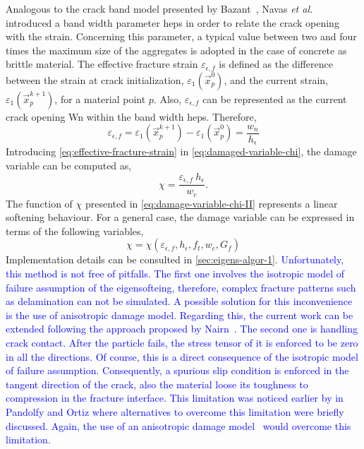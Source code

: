 \documentclass[preprint,12pt,a4paper]{elsarticle}
\begin{document}
Analogous to the crack band model presented by
Bazant~\cite{Bazant83}, Navas {\it et al.} \cite{Navas_2018_ES}
\cite{Navas_2017_ES} introduced a band width parameter \gls{heps} in order to relate the crack opening with the strain.
Concerning this parameter, a typical value between two and
four times the maximum size of the aggregates is adopted in the case of
concrete as brittle material. The effective fracture strain
$\varepsilon_{\epsilon,f}$ is defined as the difference between the strain at crack initialization,
$\varepsilon_1(\vec{x}_p^{0})$, and the current strain, $\varepsilon_1(\vec{x}_p^{k+1})$, for a material point $p$. Also,
$\varepsilon_{\epsilon,f}$ can be represented as the current crack
opening \gls{Wn} within the band width \gls{heps}. Therefore, 
\begin{equation}
  \label{eq:effective-fracture-strain}
  \varepsilon_{\epsilon,f} = \varepsilon_1(\vec{x}_p^{k+1}) -
  \varepsilon_1(\vec{x}_p^{0}) = \frac{w_n}{h_{\epsilon}}
\end{equation}
Introducing \eqref{eq:effective-fracture-strain} in
\eqref{eq:damaged-variable-chi}, the damage variable can be computed
as,
\begin{equation}
  \label{eq:damage-variable-chi-II}
\chi = \frac{\varepsilon_{\epsilon,f}\ h_{\epsilon}}{w_c}.  
\end{equation}
The function of $\chi$ presented in \eqref{eq:damage-variable-chi-II}
represents a linear softening behaviour. For a general case, the
damage variable can be expressed in terms of the following variables,
\begin{equation}
  \label{eq:damage-variable-chi-III}
  \chi = \chi(\varepsilon_{\epsilon,f}, h_{\epsilon}, f_t, w_c, G_f)
\end{equation}
Implementation details can be consulted in \ref{sec:eigens-algor-1}. \textcolor{blue}{Unfortunately, this method is not free of pitfalls. The first one involves the isotropic model of failure assumption of the eigensofteing, therefore, complex fracture patterns such as delamination can not be simulated. A possible solution for this inconvenience is the use of anisotropic damage model. Regarding this, the current work can be extended following the approach proposed by Nairn~\cite{NAIRN_2018}. The second one is handling crack contact. After the particle fails, the stress tensor of it is enforced to be zero in all the directions. Of course, this is a direct consequence of the isotropic model of failure assumption. Consequently, a spurious slip condition is enforced in the tangent direction of the crack, also the material loose its toughness to compression in the fracture interface. This limitation was noticed earlier by in Pandolfy and Ortiz \cite{Pandolfi_2012} where alternatives to overcome this limitation were briefly discussed. Again, the use of an anisotropic damage model~\cite{NAIRN_2018} would overcome this limitation.}
\end{document}
